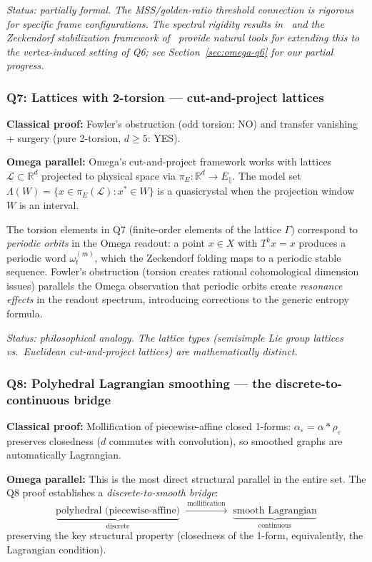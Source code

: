 \emph{Status: partially formal.  The MSS/golden-ratio threshold
connection is rigorous for specific frame configurations.
The spectral rigidity results in~\cite{omega-spectral} and the
Zeckendorf stabilization framework of~\cite{omega-zeckendorf}
provide natural tools for extending this to the vertex-induced
setting of Q6; see Section~\ref{sec:omega-q6} for our partial progress.}


\subsubsection*{Q7: Lattices with 2-torsion --- cut-and-project lattices}

\noindent\textbf{Classical proof:} Fowler's obstruction (odd torsion: NO)
and transfer vanishing + surgery (pure 2-torsion, $d\ge 5$: YES).

\noindent\textbf{Omega parallel:}
Omega's cut-and-project framework works with lattices
$\mathcal L\subset\mathbb R^d$ projected to physical space via
$\pi_E\colon\mathbb R^d\to E_\parallel$.  The model set
$\Lambda(W)=\{x\in\pi_E(\mathcal L):x^*\in W\}$ is a quasicrystal
when the projection window $W$ is an interval.

The torsion elements in Q7 (finite-order elements of the lattice
$\Gamma$) correspond to \emph{periodic orbits} in the Omega readout:
a point $x\in X$ with $T^k x=x$ produces a periodic word
$\omega^{(m)}_t$, which the Zeckendorf folding maps to a periodic
stable sequence.  Fowler's obstruction (torsion creates rational
cohomological dimension issues) parallels the Omega observation that
periodic orbits create \emph{resonance effects} in the readout
spectrum, introducing corrections to the generic entropy formula.

\emph{Status: philosophical analogy.  The lattice types (semisimple
Lie group lattices vs.\ Euclidean cut-and-project lattices) are
mathematically distinct.}


\subsubsection*{Q8: Polyhedral Lagrangian smoothing ---
  the discrete-to-continuous bridge}

\noindent\textbf{Classical proof:}
Mollification of piecewise-affine closed 1-forms:
$\alpha_\varepsilon=\alpha\ast\rho_\varepsilon$ preserves closedness
($d$ commutes with convolution), so smoothed graphs are automatically
Lagrangian.

\noindent\textbf{Omega parallel:}
This is the most direct structural parallel in the entire set.
The Q8 proof establishes a \emph{discrete-to-smooth bridge}:
\[
\underbrace{\text{polyhedral (piecewise-affine)}}_{\text{discrete}}
\;\xrightarrow{\;\text{mollification}\;}\;
\underbrace{\text{smooth Lagrangian}}_{\text{continuous}}
\]
preserving the key structural property (closedness of the 1-form,
equivalently, the Lagrangian condition).

